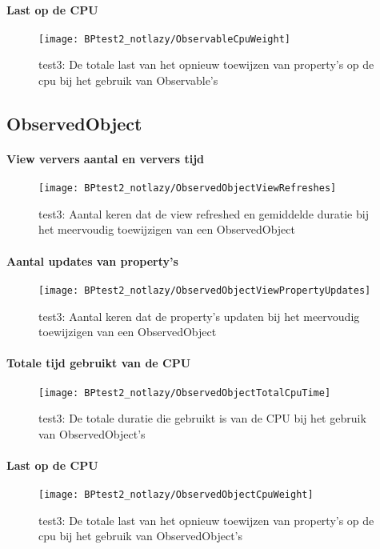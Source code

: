 \paragraph{Last op de CPU}
\begin{figure}[H]
    \centering
    \texttt{[image: BPtest2\_notlazy/ObservableCpuWeight]} 
    \caption{test3: De totale last van het opnieuw toewijzen van property's op de cpu bij het gebruik van Observable's}
    \label{fig:cpuWeightObservable3}
\end{figure}

\subsection{ObservedObject}
\paragraph{View ververs aantal en ververs tijd}
\begin{figure}[H]
    \centering
    \texttt{[image: BPtest2\_notlazy/ObservedObjectViewRefreshes]} 
    \caption{test3: Aantal keren dat de view refreshed en gemiddelde duratie bij het meervoudig toewijzigen van een ObservedObject}
    \label{fig:viewRefreshesObservedObject3}
\end{figure}
\paragraph{Aantal updates van property's}
\begin{figure}[H]
    \centering
    \texttt{[image: BPtest2\_notlazy/ObservedObjectViewPropertyUpdates]} 
    \caption{test3: Aantal keren dat de property's updaten bij het meervoudig toewijzigen van een ObservedObject}
    \label{fig:propertyUpdatesObservedObject3}
\end{figure}
\paragraph{Totale tijd gebruikt van de CPU}
\begin{figure}[H]
    \centering
    \texttt{[image: BPtest2\_notlazy/ObservedObjectTotalCpuTime]} 
    \caption{test3: De totale duratie die gebruikt is van de CPU bij het gebruik van ObservedObject's}
    \label{fig:cpuUsageTimeObservedObject3}
\end{figure}
\paragraph{Last op de CPU}
\begin{figure}[H]
    \centering
    \texttt{[image: BPtest2\_notlazy/ObservedObjectCpuWeight]} 
    \caption{test3: De totale last van het opnieuw toewijzen van property's op de cpu bij het gebruik van ObservedObject's}
    \label{fig:cpuWeightObservedObject3}
\end{figure}

